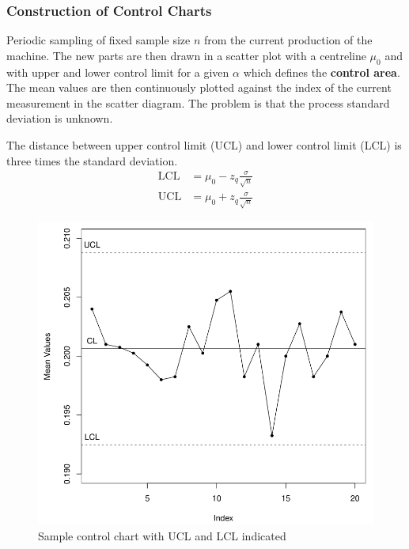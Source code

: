 \documentclass[11pt]{article}
\theoremstyle{definition}
\begin{document}
\subsubsection{Construction of Control Charts}
Periodic sampling of fixed sample size $n$ from the current production of the machine. The new parts are then drawn in a scatter plot with a centreline $\mu_0$ and with upper and lower control limit for a given $\alpha$ which defines the \textbf{control area}. The mean values are then continuously plotted against the index of the current measurement in the scatter diagram. The problem is that the process standard deviation is unknown.

The distance between upper control limit (UCL) and lower control limit (LCL) is three times the standard deviation.
\begin{align*}
	\text{LCL} &= \mu_0 - z_q \frac{\sigma}{\sqrt{n}}\\
	\text{UCL} &= \mu_0 + z_q \frac{\sigma}{\sqrt{n}}
\end{align*}

\begin{figure}[H]
	\centering
	\includegraphics[width=0.5\linewidth]{img/control_chart}
	\caption{Sample control chart with UCL and LCL indicated}
	\label{fig:controlchart}
\end{figure}
\end{document}
